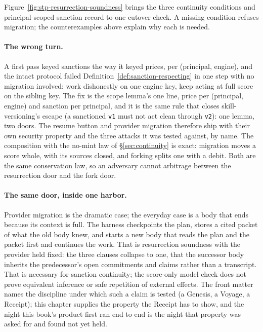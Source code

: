 \documentclass[11pt,a4paper]{article}
\theoremstyle{definition}
\newcounter{protocol}[section]
\begin{document}
Figure~\ref{fig:stp-resurrection-soundness} brings the three continuity conditions
and principal-scoped sanction record to one cutover check. A missing condition
refuses migration; the counterexamples above explain why each is needed.



\paragraph{The wrong turn.} A first pass keyed sanctions the way it keyed
prices, per (principal, engine), and the intact protocol failed
Definition~\ref{def:sanction-respecting} in one step with no migration
involved: work dishonestly on one engine key, keep acting at full score on the
sibling key. The fix is the scope lemma's one line, price per (principal,
engine) and sanction per principal, and it is the same rule that closes
skill-versioning's escape (a sanctioned \texttt{v1} must not act clean through
\texttt{v2}): one lemma, two doors. The resume button and provider migration
therefore ship with their own security property and the three attacks it was
tested against, by name. The composition with the no-mint law of
\S\ref{sec:continuity} is exact: migration moves a score whole, with its
sources closed, and forking splits one with a debit. Both are the same
conservation law, so an adversary cannot arbitrage between the resurrection
door and the fork door.

\paragraph{The same door, inside one harbor.} Provider migration is the
dramatic case; the everyday case is a body that ends because its context is
full. The harness checkpoints the plan, stores a cited packet of what the old
body knew, and starts a new body that reads the plan and the packet first and
continues the work. That is resurrection soundness with the provider held
fixed: the three clauses collapse to one, that the successor body inherits
the predecessor's open commitments and claims rather than a transcript. That
is necessary for sanction continuity; the score-only model check does not
prove equivalent inference or safe repetition of external effects. The
front matter names the discipline under which such a claim is tested (a
Genesis, a Voyage, a Receipt); this chapter supplies the property the Receipt
has to show, and the night this book's product first ran end to end is the
night that property was asked for and found not yet held.
\end{document}
